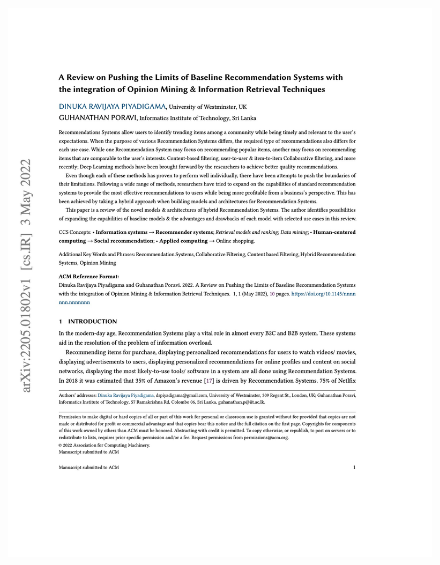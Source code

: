 \begin{figure}[h!]
\centering
\includegraphics[width=\textwidth]{images/appendix/papers/review/A Review on Pushing the Limits of Baseline Recommendation Systems with the integration of Opinion Mining & Information Retrieval Techniques.jpeg}
\end{figure}

